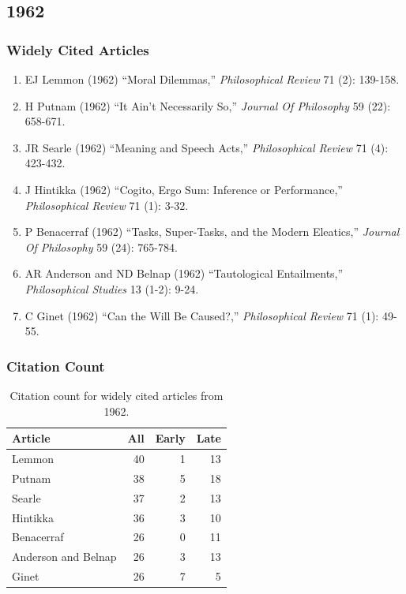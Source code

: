\documentclass[
  10pt,
  letterpaper,
  DIV=11,
  numbers=noendperiod,
  twoside]{scrartcl}
\providecommand{\tightlist}{%
  \setlength{\itemsep}{0pt}\setlength{\parskip}{0pt}}\usepackage{longtable,booktabs,array}
\begin{document}
\newpage

\subsection{1962}\label{sec-s1962}

\subsubsection*{Widely Cited Articles}\label{widely-cited-articles-6}

\begin{enumerate}
\def\labelenumi{\arabic{enumi}.}
\tightlist
\item
  EJ Lemmon (1962) ``Moral Dilemmas,'' \emph{Philosophical Review} 71
  (2): 139-158.
\item
  H Putnam (1962) ``It Ain't Necessarily So,'' \emph{Journal Of
  Philosophy} 59 (22): 658-671.
\item
  JR Searle (1962) ``Meaning and Speech Acts,'' \emph{Philosophical
  Review} 71 (4): 423-432.
\item
  J Hintikka (1962) ``Cogito, Ergo Sum: Inference or Performance,''
  \emph{Philosophical Review} 71 (1): 3-32.
\item
  P Benacerraf (1962) ``Tasks, Super-Tasks, and the Modern Eleatics,''
  \emph{Journal Of Philosophy} 59 (24): 765-784.
\item
  AR Anderson and ND Belnap (1962) ``Tautological Entailments,''
  \emph{Philosophical Studies} 13 (1-2): 9-24.
\item
  C Ginet (1962) ``Can the Will Be Caused?,'' \emph{Philosophical
  Review} 71 (1): 49-55.
\end{enumerate}

\subsubsection*{Citation Count}\label{sec-count-1962}

\begin{longtable}[]{@{}lrrr@{}}

\caption{\label{tbl-citation-count-1962}Citation count for widely cited
articles from 1962.}

\tabularnewline

\toprule\noalign{}
Article & All & Early & Late \\
\midrule\noalign{}
\endhead
\bottomrule\noalign{}
\endlastfoot
Lemmon & 40 & 1 & 13 \\
Putnam & 38 & 5 & 18 \\
Searle & 37 & 2 & 13 \\
Hintikka & 36 & 3 & 10 \\
Benacerraf & 26 & 0 & 11 \\
Anderson and Belnap & 26 & 3 & 13 \\
Ginet & 26 & 7 & 5 \\

\end{longtable}
\end{document}
